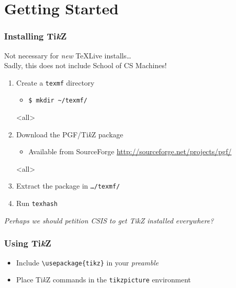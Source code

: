 \mode*		%
\section{Getting Started}
\begin{frame}
	\frametitle{Installing Ti\emph{k}Z}

	Not necessary for \emph{new} TeXLive installs\ldots\\
	Sadly, this does not include School of CS Machines!

	\pause

	\begin{enumerate}
		\item Create a \texttt{texmf} directory
		\mode<article>
		\begin{itemize}
			\item \texttt{\$ mkdir \textasciitilde/texmf/}
		\end{itemize}

		\pause

		\item Download the PGF/Ti\emph{k}Z package
		\mode<article>
		\begin{itemize}
			\item Available from SourceForge \url{http://sourceforge.net/projects/pgf/}
		\end{itemize}

		\pause

		\item Extract the package in \texttt{\ldots/texmf/}

		\pause

		\item Run \texttt{texhash}
	\end{enumerate}
\end{frame}

\textit{Perhaps we should petition CSIS to get TikZ installed everywhere?}

\begin{frame}
	\frametitle{Using Ti\emph{k}Z}
	\begin{itemize}
		\item Include \texttt{\textbackslash usepackage\{tikz\}} in your \textit{preamble}
		\item Place Ti\emph{k}Z commands in the \texttt{tikzpicture} environment
	\end{itemize}
	
\end{frame}

